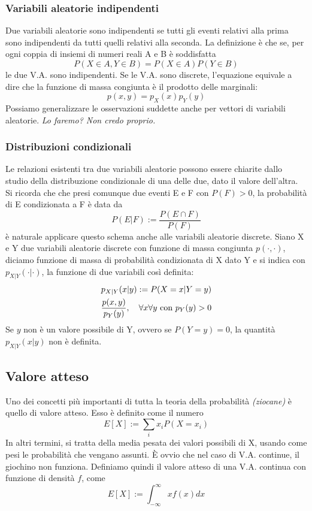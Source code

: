 \documentclass[11pt]{article}
\begin{document}
\subsubsection{Variabili aleatorie indipendenti}
Due variabili aleatorie sono indipendenti se tutti gli eventi relativi alla prima sono indipendenti da tutti quelli relativi alla seconda. 
La definizione è che se, per ogni coppia di insiemi di numeri reali A e B è soddisfatta
\begin{displaymath}
    P(X \in A, Y \in B) = P(X\in A)P(Y \in B)
\end{displaymath}
le due V.A. sono indipendenti. 
Se le V.A. sono discrete, l'equazione equivale a dire che la funzione di massa congiunta è il prodotto delle marginali:
\begin{displaymath}
    p(x,y) = p_X(x) p_Y(y)
\end{displaymath}
Possiamo generalizzare le osservazioni suddette anche per vettori di variabili aleatorie. \textit{Lo faremo? Non credo proprio.}
\subsubsection{Distribuzioni condizionali}
Le relazioni esistenti tra due variabili aleatorie possono essere chiarite dallo studio della distribuzione condizionale di una delle due, dato il valore dell'altra. Si ricorda che che presi comunque due eventi E e F con $P(F)>0$, la probabilità di E condizionata a F è data da
\begin{displaymath}
    P(E|F):=\frac{P(E\cap F)}{P(F)}
\end{displaymath}
è naturale applicare questo schema anche alle variabili aleatorie discrete.
Siano X e Y due variabili aleatorie discrete con funzione di massa congiunta $p(\cdot , \cdot)$, diciamo funzione di massa di probabilità condizionata di X dato Y e si indica con $p_{X|Y}(\cdot | \cdot)$, la funzione di due variabili così definita:
\begin{gather*}
    p_{X|Y}(x|y) := P(X=x|Y=y)\\ 
    \frac{p(x,y)}{p_Y(y)},\hspace{10px}\forall x \forall y \mbox{ con }p_Y(y)>0
\end{gather*}
Se $y$ non è un valore possibile di Y, ovvero se $P(Y=y)=0$, la quantità $p_{X|Y}(x|y)$ non è definita. 
\subsection{Valore atteso}
Uno dei concetti più importanti di tutta la teoria della probabilità \textit{(ziocane)} è quello di valore atteso. Esso è definito come il numero
\begin{displaymath}
    E[X]:=\sum_i x_i P(X=x_i)
\end{displaymath}
In altri termini, si tratta della media pesata dei valori possibili di X, usando come pesi le probabilità che vengano assunti. È ovvio che nel caso di V.A. continue, il giochino non funziona. Definiamo quindi il valore atteso di una V.A. continua con funzione di densità $f$, come
\begin{displaymath}
    E[X]:=\int_{-\infty}^\infty xf(x)dx
\end{displaymath}
\end{document}
